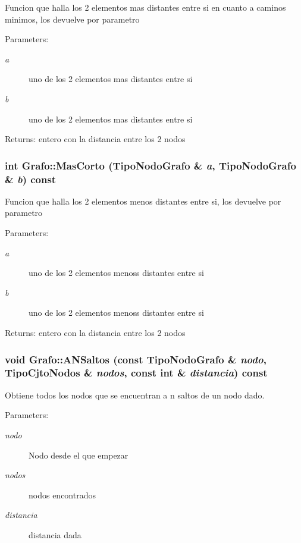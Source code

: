 Funcion que halla los 2 elementos mas distantes entre si en cuanto a caminos minimos, los devuelve por parametro \begin{Desc}
\item[Parameters:]
\begin{description}
\item[{\em a}]uno de los 2 elementos mas distantes entre si \item[{\em b}]uno de los 2 elementos mas distantes entre si \end{description}
\end{Desc}
\begin{Desc}
\item[Returns:]entero con la distancia entre los 2 nodos \end{Desc}
\subsubsection{\setlength{\rightskip}{0pt plus 5cm}int Grafo::MasCorto ({\bf TipoNodoGrafo} \& {\em a}, {\bf TipoNodoGrafo} \& {\em b}) const}\label{classGrafo_9d6cbd612abdef73a92f6fb120eb4946}


Funcion que halla los 2 elementos menos distantes entre si, los devuelve por parametro \begin{Desc}
\item[Parameters:]
\begin{description}
\item[{\em a}]uno de los 2 elementos menoss distantes entre si \item[{\em b}]uno de los 2 elementos menoss distantes entre si \end{description}
\end{Desc}
\begin{Desc}
\item[Returns:]entero con la distancia entre los 2 nodos \end{Desc}
\subsubsection{\setlength{\rightskip}{0pt plus 5cm}void Grafo::ANSaltos (const {\bf TipoNodoGrafo} \& {\em nodo}, {\bf TipoCjtoNodos} \& {\em nodos}, const int \& {\em distancia}) const}\label{classGrafo_1e658641dd50ffafdbaa0a1a16035bfe}


Obtiene todos los nodos que se encuentran a n saltos de un nodo dado. \begin{Desc}
\item[Parameters:]
\begin{description}
\item[{\em nodo}]Nodo desde el que empezar \item[{\em nodos}]nodos encontrados \item[{\em distancia}]distancia dada \end{description}
\end{Desc}
